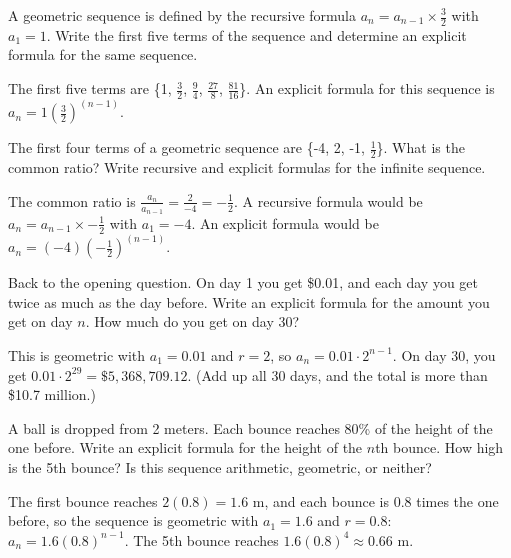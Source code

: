 \begin{Exercise}[label=seq5]
A geometric sequence is defined by the recursive formula $a_n = a_{n-1} \times \frac{3}{2}$ with $a_1 = 1$. Write the first five terms of the sequence and determine an explicit formula for the same sequence. 
\end{Exercise}

\begin{Answer}[ref=seq5]
The first five terms are \{1, $\frac{3}{2}$, $\frac{9}{4}$, $\frac{27}{8}$, $\frac{81}{16}$\}. An explicit formula for this sequence is $a_n = 1(\frac{3}{2})^{(n-1)}$. 
\end{Answer}

\begin{Exercise}[label=seq6]
The first four terms of a geometric sequence are \{-4, 2, -1, $\frac{1}{2}$\}. What is the common ratio? Write recursive and explicit formulas for the infinite sequence. 
\end{Exercise}

\begin{Answer}[ref=seq6]
The common ratio is $\frac{a_{n}}{a_{n-1}} = \frac{2}{-4} = -\frac{1}{2}$. A recursive formula would be $a_n = a_{n-1} \times -\frac{1}{2}$ with $a_1 = -4$. An explicit formula would be $a_n = (-4)(-\frac{1}{2})^{(n-1)}$. 
\end{Answer}

\begin{Exercise}[title={Pennies from heaven}, label=seq_pennies]
Back to the opening question. On day 1 you get \$0.01, and each day you get
twice as much as the day before. Write an explicit formula for the amount
you get on day $n$. How much do you get on day 30?
\end{Exercise}
\begin{Answer}[ref=seq_pennies]
This is geometric with $a_1 = 0.01$ and $r = 2$, so $a_n = 0.01 \cdot
2^{n-1}$. On day 30, you get $0.01 \cdot 2^{29} = \$5{,}368{,}709.12$.
(Add up all 30 days, and the total is more than \$10.7 million.)
\end{Answer}

\begin{Exercise}[title={Bouncing ball}, label=seq_bounce]
A ball is dropped from 2 meters. Each bounce reaches 80\% of the height of
the one before. Write an explicit formula for the height of the $n$th
bounce. How high is the 5th bounce? Is this sequence arithmetic, geometric,
or neither?
\end{Exercise}
\begin{Answer}[ref=seq_bounce]
The first bounce reaches $2(0.8) = 1.6$ m, and each bounce is 0.8 times
the one before, so the sequence is geometric with $a_1 = 1.6$ and
$r = 0.8$: $a_n = 1.6(0.8)^{n-1}$. The 5th bounce reaches
$1.6(0.8)^4 \approx 0.66$ m.
\end{Answer}
